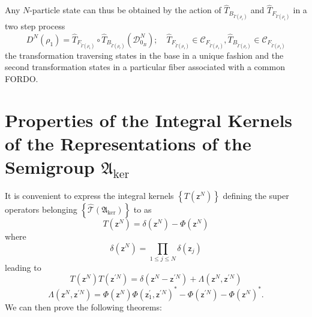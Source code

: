\documentclass[aps,preprint]{revtex4}%
\begin{document}
Any $N$-particle state can thus be obtained by the action of $\hat
{T}_{B_{\tilde{\Gamma}\left(  \mathfrak{\rho}_{r}\right)  }}$ and $\hat
{T}_{F_{\tilde{\Gamma}\left(  \rho_{1}\right)  }}$ in a two step process
\begin{equation}
D^{N}\left(  \rho_{1}\right)  =\hat{T}_{F_{\tilde{\Gamma}\left(  \rho
_{1}\right)  }}\circ\hat{T}_{B_{\tilde{\Gamma}\left(  \mathfrak{\rho}%
_{r}\right)  }}\left(  \mathcal{D}_{0_{B}}^{N}\right)  ;\quad\hat
{T}_{F_{\tilde{\Gamma}\left(  \rho_{1}\right)  }}\in\mathcal{C}_{F_{\tilde
{\Gamma}\left(  \rho_{1}\right)  }},\hat{T}_{B_{\tilde{\Gamma}\left(
\mathfrak{\rho}_{r}\right)  }}\in\mathcal{C}_{F_{\tilde{\Gamma}\left(
\rho_{1}\right)  }}%
\end{equation}
the transformation traversing states in the base in a unique fashion and the
second transformation states in a particular fiber associated with a common FORDO.

\section{Properties of the Integral Kernels of the Representations of the
Semigroup $\mathfrak{A}_{\ker}\label{sgkernel}$}

It is convenient to express the integral kernels $\left\{  T\left(
\mathsf{z}^{N}\right)  \right\}  $ defining the super operators belonging
$\left\{  \mathcal{\hat{T}}\left(  \mathfrak{A}_{\ker}\right)  \right\}  $ to
as
\begin{equation}
T\left(  \mathsf{z}^{N}\right)  =\delta\left(  \mathsf{z}^{N}\right)
-\Phi\left(  \mathsf{z}^{N}\right)
\end{equation}
where
\begin{equation}
\delta\left(  \mathsf{z}^{N}\right)  =%
{\displaystyle\prod\limits_{1\leq j\leq N}}
\delta\left(  \mathsf{z}_{j}\right)
\end{equation}
leading to
\begin{equation}
T\left(  \mathsf{z}^{N}\right)  T\left(  \mathsf{z}^{\prime N}\right)
=\delta\left(  \mathsf{z}^{N}-\mathsf{z}^{\prime N}\right)  +\Lambda\left(
\mathsf{z}^{N},\mathsf{z}^{\prime N}\right)
\end{equation}%
\begin{equation}
\Lambda\left(  \mathsf{z}^{N},\mathsf{z}^{\prime N}\right)  =\Phi\left(
\mathsf{z}^{N}\right)  \Phi\left(  \mathsf{z}_{1}^{\prime},\mathsf{z}^{\prime
N}\right)  ^{\ast}-\Phi\left(  \mathsf{z}^{\prime N}\right)  -\Phi\left(
\mathsf{z}^{N}\right)  ^{\ast}.
\end{equation}
We can then prove the following theorems:
\end{document}
